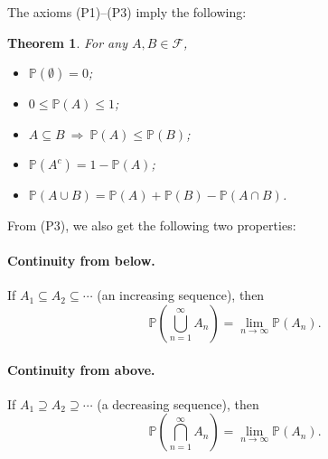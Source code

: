 \documentclass[twoside]{article}
\newcounter{lecnum}
\newtheorem{theorem}{Theorem}[lecnum]
\begin{document}
The axioms (P1)–(P3) imply the following:

\begin{theorem}
For any $A,B\in\mathcal{F}$,
\begin{itemize}
  \item $\mathbb{P}(\emptyset)=0$;
  \item $0\le \mathbb{P}(A)\le 1$;
  \item $A\subseteq B \ \Rightarrow\ \mathbb{P}(A)\le \mathbb{P}(B)$;
  \item $\mathbb{P}(A^{c}) = 1-\mathbb{P}(A)$;
  \item $\mathbb{P}(A\cup B)=\mathbb{P}(A)+\mathbb{P}(B)-\mathbb{P}(A\cap B)$.
\end{itemize}
\end{theorem}

From (P3), we also get the following two properties:

\paragraph{Continuity from below.}
If $A_1\subseteq A_2\subseteq\cdots$ (an increasing sequence), then
\[
  \mathbb{P}\!\left(\bigcup_{n=1}^{\infty} A_n\right)
  = \lim_{n\to\infty}\mathbb{P}(A_n).
\]

\paragraph{Continuity from above.}
If $A_1\supseteq A_2\supseteq\cdots$ (a decreasing sequence), then
\[
  \mathbb{P}\!\left(\bigcap_{n=1}^{\infty} A_n\right)
  = \lim_{n\to\infty}\mathbb{P}(A_n).
\]
\end{document}
